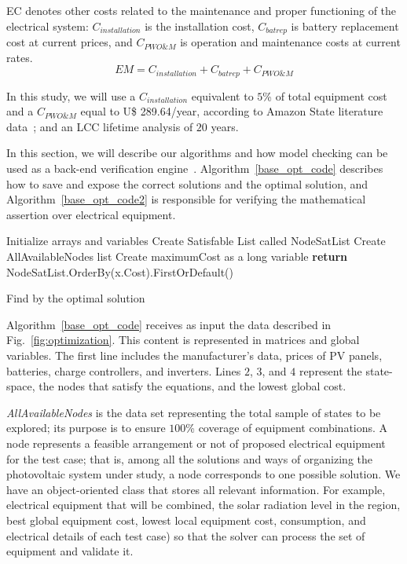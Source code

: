 \documentclass[10pt,journal,compsoc]{IEEEtran}
\begin{document}
EC denotes other costs related to the maintenance and proper functioning of the electrical system: $C_{installation}$ is the installation cost, $C_{batrep}$ is battery replacement cost at current prices, and $C_{PWO\&M}$ is operation and maintenance costs at current rates.
\begin{equation}
\label{eq:EquipamentMaintenence}
EM = C_{installation} + C_{batrep} + C_{PWO\&M}
\end{equation}

In this study, we will use a $C_{installation}$ equivalent to $5$\% of total equipment cost and a $C_{PWO\&M}$ equal to U\$ 289.64/year, according to Amazon State literature data~\cite{Agrener2013}; and an LCC lifetime analysis of $20$ years.

In this section, we will describe our algorithms and how model checking can be used as a back-end verification engine~\cite{DBLP:journals/corr/abs-1909-13139}. Algorithm~\ref{base_opt_code} describes how to save and expose the correct solutions and the optimal solution, and Algorithm~\ref{base_opt_code2} is responsible for verifying the mathematical assertion over electrical equipment.

\begin{algorithm}[ht]
\SetAlgoLined
{}
Initialize arrays and variables\;
Create Satisfable List called NodeSatList\;
Create AllAvailableNodes list\;
Create maximumCost as a long variable\;
\textbf{return} NodeSatList.OrderBy(x.Cost).FirstOrDefault()
\caption{Find by the optimal solution}
\label{base_opt_code}
\end{algorithm}

Algorithm~\ref{base_opt_code} receives as input the data described in Fig.~\ref{fig:optimization}. This content is represented in matrices and global variables. The first line includes the manufacturer's data, prices of PV panels, batteries, charge controllers, and inverters. Lines $2$, $3$, and $4$ represent the state-space, the nodes that satisfy the equations, and the lowest global cost.

\textit{AllAvailableNodes} is the data set representing the total sample of states to be explored; its purpose is to ensure $100$\% coverage of equipment combinations. A node represents a feasible arrangement or not of proposed electrical equipment for the test case; that is, among all the solutions and ways of organizing the photovoltaic system under study, a node corresponds to one possible solution. We have an object-oriented class that stores all relevant information. For example, electrical equipment that will be combined, the solar radiation level in the region, best global equipment cost, lowest local equipment cost, consumption, and electrical details of each test case) so that the solver can process the set of equipment and validate it.
\end{document}
